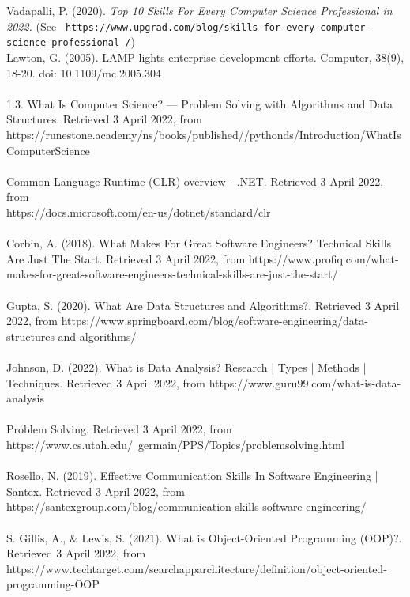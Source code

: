 \documentclass[a4paper, 11pt]{report}
\begin{document}
	\\
	\\
	Vadapalli, P. (2020). \textit{ Top 10 Skills For Every Computer Science Professional in 2022.} (See \texttt{ https://www.upgrad.com/blog/skills-for-every-computer-science-professional /})
	\\
	Lawton, G. (2005). LAMP lights enterprise development efforts. Computer, 38(9), 18-20. doi: 10.1109/mc.2005.304
	\\
	\\
	1.3. What Is Computer Science? — Problem Solving with Algorithms and Data Structures. Retrieved 3 April 2022, from \\https://runestone.academy/ns/books/published//pythonds/Introduction/WhatIsComputerScience
	\\
	\\
	Common Language Runtime (CLR) overview - .NET. Retrieved 3 April 2022, from \\https://docs.microsoft.com/en-us/dotnet/standard/clr
	\\
	\\
	Corbin, A. (2018). What Makes For Great Software Engineers? Technical Skills Are Just The Start. Retrieved 3 April 2022, from https://www.profiq.com/what-makes-for-great-software-engineers-technical-skills-are-just-the-start/
	\\
	\\
	Gupta, S. (2020). What Are Data Structures and Algorithms?. Retrieved 3 April 2022, from https://www.springboard.com/blog/software-engineering/data-structures-and-algorithms/
	\\
	\\
	Johnson, D. (2022). What is Data Analysis? Research | Types | Methods | Techniques. Retrieved 3 April 2022, from https://www.guru99.com/what-is-data-analysis
	\\
	\\
	Problem Solving. Retrieved 3 April 2022, from 
	\\https://www.cs.utah.edu/~germain/PPS/Topics/problemsolving.html
	\\
	\\
	Rosello, N. (2019). Effective Communication Skills In Software Engineering | Santex. Retrieved 3 April 2022, from https://santexgroup.com/blog/communication-skills-software-engineering/
	\\
	\\
	S. Gillis, A., & Lewis, S. (2021). What is Object-Oriented Programming (OOP)?. Retrieved 3 April 2022, from https://www.techtarget.com/searchapparchitecture/definition/object-oriented-programming-OOP
\end{document}
